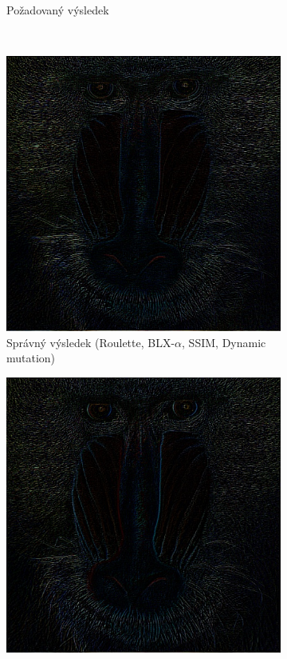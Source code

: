 \documentclass[a4paper,11pt,titlepage]{scrartcl}
\begin{document}
\begin{figure}[!h]
\begin{subfigure}[b]{0.40\textwidth}
        \caption{Požadovaný výsledek}
        \label{fig:gull}
    \end{subfigure}
    \\
    \begin{subfigure}[b]{0.32\textwidth}
        \includegraphics[width=\textwidth]{img/roulette-blx_a-ssim-dynamic_example1.jpg}
        \caption{Správný výsledek (Roulette, BLX-$\alpha$, SSIM, Dynamic mutation)}
        \label{fig:ex11}
    \end{subfigure}
    \begin{subfigure}[b]{0.32\textwidth}
        \includegraphics[width=\textwidth]{img/ranksel-simple-ssim-dynamic_example1.jpg}

\end{subfigure}
\end{figure}
\end{document}
